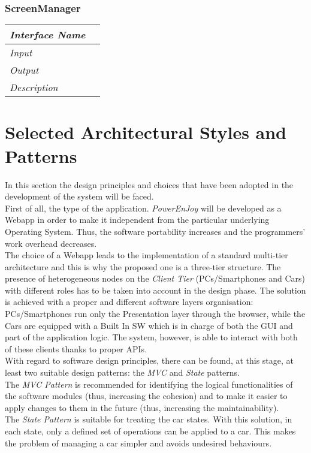 \documentclass[11pt,a4paper]{report}
\begin{document}
\subsubsection{ScreenManager}
\begin{tabularx}{\textwidth}{|>{\em}l|X|}
	\hline
	Interface Name& \\
	\hline
	Input & \\
	\hline
	Output & \\
	\hline
	Description &\\
	\hline
\end{tabularx}

\section{Selected Architectural Styles and Patterns}
In this section the design principles and choices that have been adopted in the development of the system will be faced.\\First of all, the type of the application. \textit{PowerEnJoy} will be developed as a Webapp in order to make it independent from the particular underlying Operating System. Thus, the software portability increases and the programmers' work overhead decreases.\\The choice of a Webapp leads to the implementation of a standard multi-tier architecture and this is why the proposed one is a three-tier structure. The presence of heterogeneous nodes on the \textit{Client Tier} (PCs/Smartphones and Cars) with different roles  has to be taken into account in the design phase. The solution is achieved with a proper and different software layers organisation: PCs/Smartphones run only the Presentation layer through the browser, while the Cars are equipped with a Built In SW which is in charge of both the GUI and part of the application logic. The system, however, is able to interact with both of these clients thanks to proper APIs.\\With regard to software design principles, there can be found, at this stage, at least two suitable design patterns: the \textit{MVC} and \textit{State} patterns.\\The \textit{MVC Pattern} is recommended for identifying the logical functionalities of the software modules (thus, increasing the cohesion) and to make it easier to apply changes to them in the future (thus, increasing the maintainability).\\The \textit{State Pattern} is suitable for treating the car states. With this solution, in each state, only a defined set of operations can be applied to a car. This makes the problem of managing a car simpler and avoids undesired behaviours.
\end{document}
